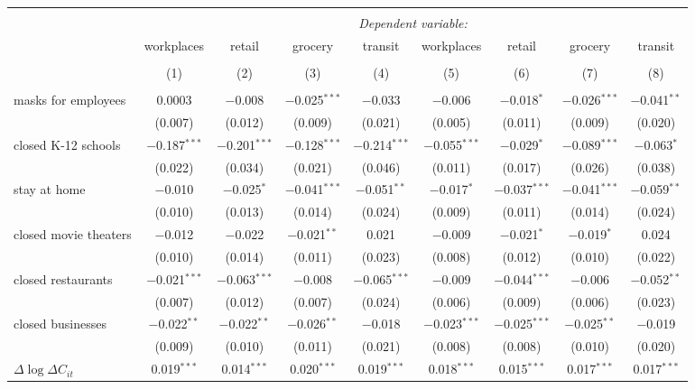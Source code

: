 \begin{tabular}{@{\extracolsep{1pt}}lcccccccc} 
\\[-1.8ex]\hline 
\hline \\[-1.8ex] 
 & \multicolumn{8}{c}{\textit{Dependent variable:}} \\ 
\cline{2-9} 
 & workplaces & retail & grocery & transit & workplaces & retail & grocery & transit \\ 
\\[-1.8ex] & (1) & (2) & (3) & (4) & (5) & (6) & (7) & (8)\\ 
\hline \\[-1.8ex] 
 masks for employees & 0.0003 & $-$0.008 & $-$0.025$^{***}$ & $-$0.033 & $-$0.006 & $-$0.018$^{*}$ & $-$0.026$^{***}$ & $-$0.041$^{**}$ \\ 
  & (0.007) & (0.012) & (0.009) & (0.021) & (0.005) & (0.011) & (0.009) & (0.020) \\ 
  closed K-12 schools & $-$0.187$^{***}$ & $-$0.201$^{***}$ & $-$0.128$^{***}$ & $-$0.214$^{***}$ & $-$0.055$^{***}$ & $-$0.029$^{*}$ & $-$0.089$^{***}$ & $-$0.063$^{*}$ \\ 
  & (0.022) & (0.034) & (0.021) & (0.046) & (0.011) & (0.017) & (0.026) & (0.038) \\ 
  stay at home & $-$0.010 & $-$0.025$^{*}$ & $-$0.041$^{***}$ & $-$0.051$^{**}$ & $-$0.017$^{*}$ & $-$0.037$^{***}$ & $-$0.041$^{***}$ & $-$0.059$^{**}$ \\ 
  & (0.010) & (0.013) & (0.014) & (0.024) & (0.009) & (0.011) & (0.014) & (0.024) \\ 
  closed movie theaters & $-$0.012 & $-$0.022 & $-$0.021$^{**}$ & 0.021 & $-$0.009 & $-$0.021$^{*}$ & $-$0.019$^{*}$ & 0.024 \\ 
  & (0.010) & (0.014) & (0.011) & (0.023) & (0.008) & (0.012) & (0.010) & (0.022) \\ 
  closed restaurants & $-$0.021$^{***}$ & $-$0.063$^{***}$ & $-$0.008 & $-$0.065$^{***}$ & $-$0.009 & $-$0.044$^{***}$ & $-$0.006 & $-$0.052$^{**}$ \\ 
  & (0.007) & (0.012) & (0.007) & (0.024) & (0.006) & (0.009) & (0.006) & (0.023) \\ 
  closed businesses & $-$0.022$^{**}$ & $-$0.022$^{**}$ & $-$0.026$^{**}$ & $-$0.018 & $-$0.023$^{***}$ & $-$0.025$^{***}$ & $-$0.025$^{**}$ & $-$0.019 \\ 
  & (0.009) & (0.010) & (0.011) & (0.021) & (0.008) & (0.008) & (0.010) & (0.020) \\ 
  $\Delta \log \Delta C_{it}$ & 0.019$^{***}$ & 0.014$^{***}$ & 0.020$^{***}$ & 0.019$^{***}$ & 0.018$^{***}$ & 0.015$^{***}$ & 0.017$^{***}$ & 0.017$^{***}$ \\ 

\end{tabular}
